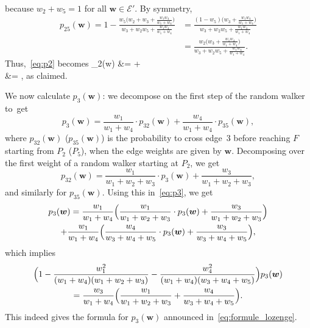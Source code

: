 \documentclass[JEP,XML,SOM,Unicode,NoFloatCountersInSection,published]{cedram}
\let\mathcal\mathscr
\def\ba#1\ea{\begin{align*}#1\end{align*}}
\numberwithin{equation}{section}
\theoremstyle{definition}
\let\bs\boldsymbol
\begin{document}
because $w_2 +w_5=1$ for all $\bs w\in\mathcal E'$.
By symmetry,
\begin{align*}
p_{25}(\bs w)= 1- \frac{w_5\big(w_2+w_3+\frac{w_1w_4}{w_1+w_4}\big)}{w_3+w_2w_5+\frac{w_1w_4}{w_1+w_4}}
&= \frac{(1-w_5)\big(w_3+\frac{w_1w_4}{w_1+w_4}\big)}{w_3+w_2w_5+\frac{w_1w_4}{w_1+w_4}}\\
&= \frac{w_2\big(w_3+\frac{w_1w_4}{w_1+w_4}\big)}{w_3+w_2w_5+\frac{w_1w_4}{w_1+w_4}}.
\end{align*}
Thus,~\eqref{eq:p2} becomes
\ba
p_2(\bs w)
&= \cdot {}
+\cdot{}\\
&= ,
\ea
as claimed.

We now calculate $p_3(\bs w)$: we decompose on the first step of the random walker to~get
\begin{equation}\label{eq:p3}
p_3(\bs w)
= \frac{w_1}{w_1+w_4}\cdot p_{32}(\bs w) + \frac{w_4}{w_1+w_4}\cdot p_{35}(\bs w),
\end{equation}
where $p_{32}(\bs w)$ (\resp $p_{35}(\bs w)$) is the probability to cross edge~$3$ before reaching $F$ starting from $P_2$ (\resp $P_5$), when the edge weights are given by $\bs w$.
Decomposing over the first weight of a random walker starting at $P_2$, we get
\[
p_{32}(\bs w) = \frac{w_1}{w_1+w_2+w_3}\cdot p_3(\bs w) + \frac{w_3}{w_1+w_2+w_3},
\]
and similarly for $p_{35}(\bs w)$.
Using this in~\eqref{eq:p3}, we get
\begin{multline*}
p_3(\bs w)
= \frac{w_1}{w_1+w_4}\Bigl(\frac{w_1}{w_1+w_2+w_3}\cdot p_3(\bs w) + \frac{w_3}{w_1+w_2+w_3} \Bigr)\\
+\frac{w_1}{w_1+w_4} \Bigl(\frac{w_4}{w_3+w_4+w_5}\cdot p_3(\bs w) + \frac{w_3}{w_3+w_4+w_5} \Bigr),
\end{multline*}
which implies
\begin{multline*}
\Bigl(1-\frac{w_1^2}{(w_1+w_4)(w_1+w_2+w_3)}-\frac{w_4^2}{(w_1+w_4)(w_3+w_4+w_5)} \Bigr)p_3(\bs w)\\
= \frac{w_3}{w_1+w_4} \Bigl(\frac{w_1}{w_1+w_2+w_3}+\frac{w_4}{w_3+w_4+w_5} \Bigr).
\end{multline*}
This indeed gives the formula for $p_3(\bs w)$ announced in~\eqref{eq:formule_lozenge}.
\end{document}
